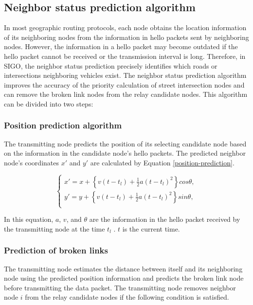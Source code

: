 \documentclass[conference]{IEEEtran}
\begin{document}
\subsection{Neighbor status prediction algorithm}
\label{neighbor_status}
In most geographic routing protocols, each node obtains the location information of its neighboring nodes from the  information in hello packets sent by neighboring nodes.
However, the information in a hello packet may become outdated if the hello packet cannot be received or the transmission interval is long.
Therefore, in SIGO, the neighbor status prediction precisely identifies which roads or intersections neighboring vehicles exist. 
The neighbor status prediction algorithm improves the accuracy of the priority calculation of street intersection nodes and can remove the broken link nodes from the relay candidate nodes. This algorithm can be divided into two steps:
\subsubsection{Position prediction algorithm}

The transmitting node predicts the position of its selecting candidate  node based on the information in the candidate node's hello
packets. 
The predicted neighbor node's coordinates $x'$ and $y'$ are calculated by Equation \ref{position-prediction}.

\begin{equation}
\label{position-prediction}
\begin{cases}
x' = x + \left\{v(t-t_l) + \frac{1}{2}a(t-t_l)^2\right\}cos\theta, \\
y' = y + \left\{v(t-t_l) + \frac{1}{2}a(t-t_l)^2\right\}sin\theta, \\
\end{cases}
\end{equation}

In this equation, $a$, $v$, and $\theta$ are the information in the hello packet received by the transmitting node at the time $t_l$ . $t$ is the current time.

\subsubsection{Prediction of broken links}
The transmitting node estimates the distance between itself and its neighboring node using the predicted position information and predicts the broken link node before transmitting the data packet. The transmitting node removes neighbor node $i$ from the relay candidate nodes if the following condition is satisfied.
\end{document}
